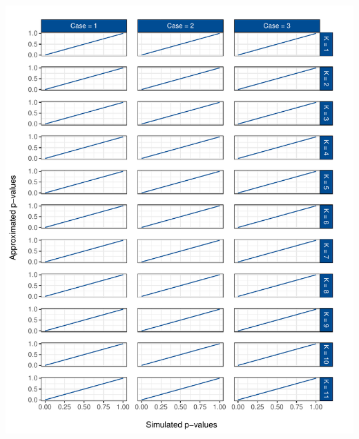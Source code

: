\documentclass[12pt,a4paper]{article}
\let\origfigure\figure
\let\endorigfigure\endfigure
\renewenvironment{figure}[1][2] {
    \expandafter\origfigure\expandafter[H]
} {
    \endorigfigure
}
\begin{document}
\FloatBarrier

\begin{figure}
\centering
\includegraphics{p_approx_paper_files/figure-latex/approx_sim-all-1.pdf}
\caption{\label{fig:sim_approx_all} Simulated against approximated
\(p\)-values over the whole distribution for all cases and all
underlying tests.}
\end{figure}
\end{document}
